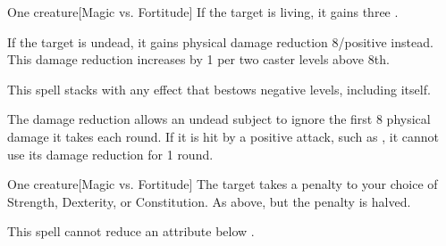 \spellrng{\rngclose}
\spelldur{\durshort}
\begin{spelltarget}{One creature}[Magic vs. Fortitude]
    \spelleffect If the target is living, it gains three \negativelevels.

    If the target is undead, it gains physical damage reduction 8/positive instead. This damage reduction increases by 1 per two caster levels above 8th.
\end{spelltarget}
\spellnotes This spell stacks with any effect that bestows negative levels, including itself.

The damage reduction allows an undead subject to ignore the first 8 physical damage it takes each round. If it is hit by a positive attack, such as , it cannot use its damage reduction for 1 round.

\spellrng{\rngmed}
\spelldur{\durshort}
\begin{spelltarget}{One creature}[Magic vs. Fortitude]
    \spellsuccess The target takes a  penalty to your choice of Strength, Dexterity, or Constitution.
    \spellfailure As above, but the penalty is halved.
\end{spelltarget}
\spellnotes This spell cannot reduce an attribute below .

